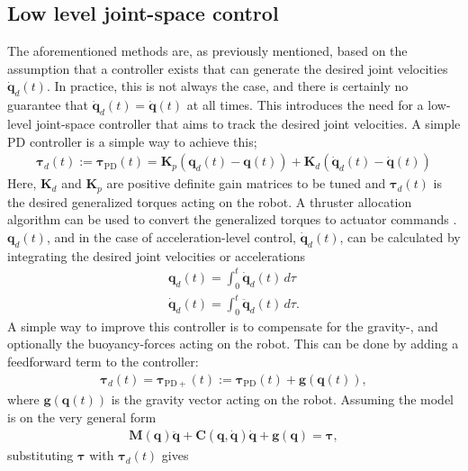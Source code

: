 \subsection{Low level joint-space control}

The aforementioned methods are, as previously mentioned, based on the assumption
that a controller exists that can generate the desired joint velocities $\dot{\bm{q}}_d(t)$.
In practice, this is not always the case, and there is certainly no guarantee that
$\dot{\bm{q}}_d(t) = \dot{\bm{q}}(t)$ at all times. This introduces the need for a
low-level joint-space controller that aims to track the desired joint velocities.
A simple PD controller is a simple way to achieve this;
\begin{align}
    \bm{\tau}_d(t) :=  \bm{\tau}_{\mathrm{PD}}(t) =
        \bm{K}_p \left( \bm{q}_d(t) - \bm{q}(t) \right)
        + \bm{K}_d \left( \dot{\bm{q}}_d(t) - \dot{\bm{q}}(t)\right) \label{eq:Kp_Kd}
\end{align}
Here, $\bm{K}_d$ and $\bm{K}_p$ are positive definite gain matrices to be tuned
and $\bm{\tau}_d(t)$ is the desired generalized torques acting on the robot. A
thruster allocation algorithm can be used to convert the generalized torques to
actuator commands \cite{fossen2021}. $\bm{q}_d(t)$, and in the case of
acceleration-level control, $\dot{\bm{q}}_d(t)$, can be calculated by
integrating the desired joint velocities or accelerations
\begin{subequations}
\begin{align}
    \bm{q}_d(t) = \int_0^t \dot{\bm{q}}_d(t) \, d\tau \\
    \dot{\bm{q}}_d(t) = \int_{0}^t \ddot{\bm{q}}_d(t)\, d\tau.
\end{align}
\end{subequations}
A simple way to improve this controller is to compensate for the gravity-, and
optionally the buoyancy-forces acting on the robot. This can be done by adding
a feedforward term to the controller:
\begin{align}
    \bm{\tau}_d(t) = \bm{\tau}_{\mathrm{PD+}}(t) :=
    \bm{\tau}_{\mathrm{PD}}(t) + \bm{g}(\bm{q}(t)),
\end{align}
where $\bm{g}(\bm{q}(t))$ is the gravity vector acting on the robot. Assuming the
model is on the very general form
\begin{align}
    \bm{M}(\bm{q}) \ddot{\bm{q}} + \bm{C}(\bm{q}, \dot{\bm{q}}) \dot{\bm{q}} + \bm{g}(\bm{q}) = \bm{\tau},
\end{align}
substituting $\bm{\tau}$ with $\bm{\tau}_d(t)$ gives
